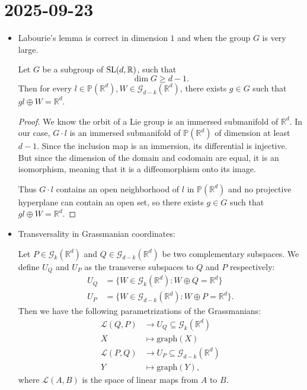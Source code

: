 \documentclass{report}
\begin{document}
\section{2025-09-23}
\begin{itemize}
    \item Labourie's lemma is correct in dimension $1$ and when the group $G$ is very large.
    \begin{proposition}
        Let $G$ be a subgroup of $\operatorname{{\mathrm{SL}}}(d,\mathbb R)$, such that
        \[
        \dim G \geq d-1.
        \]
        Then for every $l \in \mathbb P(\mathbb R^d), W \in \mathcal G_{d-k}(\mathbb R^d)$, there exists $g \in G$ such that $g l \oplus W = \mathbb R^d$.
    \end{proposition}
    \begin{proof}
        We know the orbit of a Lie group is an immersed submanifold of $\mathbb R^d$.
        In our case, $G \cdot l$ is an immersed submanifold of $\mathbb P(\mathbb R^d)$ of dimension at least $d-1$.
        Since the inclusion map is an immersion, its differential is injective. But since the dimension of the domain and codomain are equal, it is an isomorphism, meaning that it is a diffeomorphism onto its image.
        
        Thus $G \cdot l$ contains an open neighborhood of $l$ in $\mathbb P(\mathbb R^d)$ and no projective hyperplane can contain an open set, so there exists $g \in G$ such that $g l \oplus W = \mathbb R^d$.
    \end{proof}
    \item Transversality in Grassmanian coordinates:
    \begin{proposition}
        Let $P \in \mathcal G_k(\mathbb R^d)$ and $Q \in \mathcal G_{d-k}(\mathbb R^d)$ be two complementary subspaces.
        We define $U_Q$ and $U_P$ as the transverse subspaces to $Q$ and $P$ respectively:
        \begin{align*}
            U_Q &= \{W \in \mathcal G_k(\mathbb R^d): W \oplus Q = \mathbb R^d\}\\
            U_P &= \{W \in \mathcal G_{d-k}(\mathbb R^d): W \oplus P = \mathbb R^d\}.
        \end{align*}
        Then we have the following parametrizations of the Grassmanians:
        \begin{align*}
            \mathcal L(Q, P) &\to U_Q \subseteq \mathcal G_k(\mathbb R^d)\\
            X &\mapsto \mathrm{graph}(X)\\
            \mathcal L(P, Q) &\to U_P \subseteq \mathcal G_{d-k}(\mathbb R^d)\\
            Y &\mapsto \mathrm{graph}(Y),
        \end{align*}
        where $\mathcal L(A,B)$ is the space of linear maps from $A$ to $B$.


\end{proposition}
\end{itemize}
\end{document}
